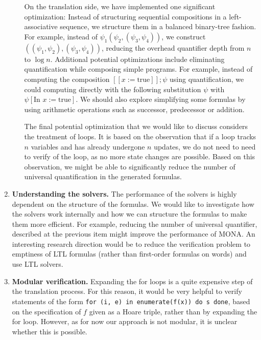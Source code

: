 \begin{enumerate}
\begin{enumerate}
        On the translation side, we have implemented one significant optimization: Instead of structuring sequential compositions in a left-associative sequence,
        we structure them in a balanced binary-tree fashion. For example, instead of \(\psi_1 (\psi_2, (\psi_3, \psi_4))\),
        we construct \(((\psi_1, \psi_2), (\psi_3, \psi_4))\), reducing  the overhead quantifier depth from \(n\) to \(\log n\).
        Additional potential optimizations include eliminating quantification while composing simple programs.
        For example, instead of computing the composition \( [[x := \text{true}]]; \psi \) using quantification,
        we could computing directly with the following substitution \(\psi\) with \(\psi[\text{In } x := \text{true}]\).
        We should also explore simplifying some formulas by using arithmetic operations such as successor, predecessor or addition.
    
        The final potential optimization that we would like to discuss considers the treatment of loops. It is based on the observation that 
        if a loop tracks $n$ variables and has already undergone $n$ updates, we do not need to need to verify  of the loop, 
        as no more state changes are possible. Based on this observation, we might be able to significantly reduce the number of universal 
        quantification in the generated formulas.
    \end{enumerate}

    \item \textbf{Understanding the solvers.} The performance of the solvers is highly dependent on the structure of the formulas.
    We would like to investigate how the solvers work internally and how we can structure the formulas to make them more efficient.
    For example, reducing the number of universal quantifier, described at the previous item might improve the performance of MONA.
    An interesting research direction would be to reduce the verification problem to emptiness of LTL formulas (rather than first-order formulas on
    words) and use LTL solvers.

    \item \textbf{Modular verification.} Expanding the for loops is a quite expensive step of the translation process. For this reason,
     it would be very helpful to verify statements of the form \texttt{for (i, e) in enumerate(f(x)) do s done}, based on the 
     specification of $f$ given as a Hoare triple, rather than by expanding the for loop. However, as for now our approach is not 
     modular, it is unclear whether this is possible. 


\end{enumerate}
